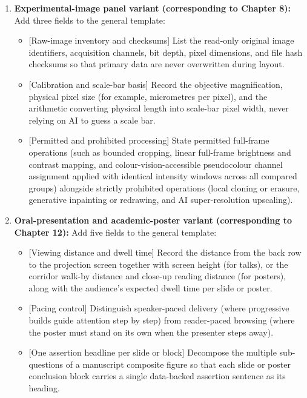 \begin{enumerate}
\begin{itemize}
    \item {[Omissions and simplifications]} Record collateral pathways, cofactors, or secondary steps deliberately omitted to control visual density, and carry those notes into the figure legend.
  \end{itemize}
  \item \textbf{Experimental-image panel variant (corresponding to Chapter 8):} Add three fields to the general template:
  \begin{itemize}
    \item {[Raw-image inventory and checksums]} List the read-only original image identifiers, acquisition channels, bit depth, pixel dimensions, and file hash checksums so that primary data are never overwritten during layout.
    \item {[Calibration and scale-bar basis]} Record the objective magnification, physical pixel size (for example, micrometres per pixel), and the arithmetic converting physical length into scale-bar pixel width, never relying on AI to guess a scale bar.
    \item {[Permitted and prohibited processing]} State permitted full-frame operations (such as bounded cropping, linear full-frame brightness and contrast mapping, and colour-vision-accessible pseudocolour channel assignment applied with identical intensity windows across all compared groups) alongside strictly prohibited operations (local cloning or erasure, generative inpainting or redrawing, and AI super-resolution upscaling).
  \end{itemize}
  \item \textbf{Oral-presentation and academic-poster variant (corresponding to Chapter 12):} Add five fields to the general template:
  \begin{itemize}
    \item {[Viewing distance and dwell time]} Record the distance from the back row to the projection screen together with screen height (for talks), or the corridor walk-by distance and close-up reading distance (for posters), along with the audience's expected dwell time per slide or poster.
    \item {[Pacing control]} Distinguish speaker-paced delivery (where progressive builds guide attention step by step) from reader-paced browsing (where the poster must stand on its own when the presenter steps away).
    \item {[One assertion headline per slide or block]} Decompose the multiple sub-questions of a manuscript composite figure so that each slide or poster conclusion block carries a single data-backed assertion sentence as its heading.

\end{itemize}
\end{enumerate}

